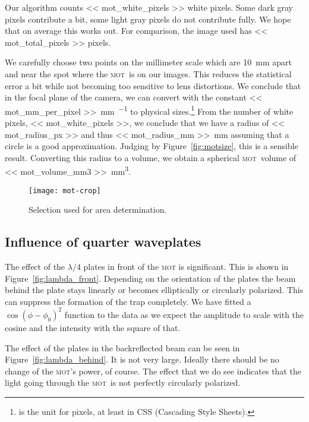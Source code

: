 \documentclass[11pt, english, fleqn, DIV=15, headinclude, BCOR=2cm]{scrreprt}
\newcommand\mot{\textsc{mot}}
\begin{document}
Our algorithm counts \num{<< mot_white_pixels >>} white pixels. Some dark gray
pixels contribute a bit, some light gray pixels do not contribute fully. We
hope that on average this works out. For comparison, the image used has \num{<<
mot_total_pixels >>} pixels.

We carefully choose two points on the millimeter scale which are
\SI{10}{\milli\meter} apart and near the spot where the \mot\ is on our images.
This reduces the statistical error a bit while not becoming too sensitive to
lens distortions. We conclude that in the focal plane of the camera, we can
convert with the constant \SI{<< mot_mm_per_pixel >>}{\milli\meter\per\pixel}
to physical sizes.\footnote{\si{\pixel} is the unit for pixels, at least in CSS
(Cascading Style Sheets).} From the number of white pixels, \num{<<
mot_white_pixels >>}, we conclude that we have a radius of \SI{<< mot_radius_px
>>}{\pixel} and thus \SI{<< mot_radius_mm >>}{\milli\meter} assuming that a
circle is a good approximation. Judging by Figure~\ref{fig:motsize}, this is a
sensible result. Converting this radius to a volume, we obtain a spherical
\mot\ volume of \SI{<< mot_volume_mm3 >>}{\milli\meter\cubed}.


\begin{figure}
    \centering
    \texttt{[image: mot-crop]}
    \caption{%
        Selection used for area determination.
    }
    \label{fig:mot-crop}
\end{figure}

\subsection{Influence of quarter waveplates}

The effect of the $\lambda/4$ plates in front of the \mot{} is significant.
This is shown in Figure~\ref{fig:lambda_front}. Depending on the orientation of
the plates the beam behind the plate stays linearly or becomes elliptically or
circularly polarized. This can suppress the formation of the trap completely.
We have fitted a $\cos(\phi - \phi_0)^2$ function to the data as we expect the
amplitude to scale with the cosine and the intensity with the square of that.

The effect of the plates in the backreflected beam can be seen in
Figure~\ref{fig:lambda_behind}. It is not very large. Ideally there should be
no change of the \mot's power, of course. The effect that we do see indicates
that the light going through the \mot\ is not perfectly circularly polarized.
\end{document}
